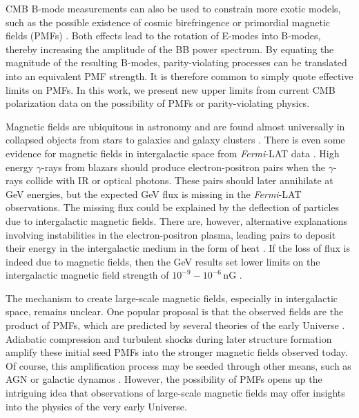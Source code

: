 \documentclass[apj]{emulateapj}
\newcommand{\fermilat}{\textit{Fermi}-LAT}
\begin{document}
CMB B-mode measurements can also be used to constrain more exotic models, such as the possible existence of cosmic birefringence \citep{carroll98,lue99} or primordial magnetic fields (PMFs) \citep{kosowsky96, seshadri01}.  
Both effects lead to the rotation of E-modes into B-modes, thereby increasing the amplitude of the BB power spectrum.
By equating the magnitude of the resulting B-modes, parity-violating processes can be translated into an equivalent PMF strength. 
It is therefore common to simply quote effective limits on PMFs. 
In this work, we present new upper limits from current CMB polarization data on the possibility of PMFs or parity-violating physics. 

Magnetic fields are ubiquitous in astronomy and are found almost universally in collapsed objects from stars to galaxies and galaxy clusters \citep[for a review, see][]{ryu12, widrow12}. 
There is even some evidence for magnetic fields in intergalactic space from \fermilat{} data \citep{neronov10}.
High energy $\gamma$-rays from blazars should  produce electron-positron pairs when the $\gamma$-rays collide with IR or optical photons. 
These pairs should later annihilate at GeV energies, but the expected GeV flux is missing in the \fermilat{} observations. 
The missing flux could be explained by the deflection of particles due to intergalactic magnetic fields. 
There are, however, alternative explanations involving instabilities in the electron-positron plasma, leading pairs to deposit their energy in the intergalactic medium in the form of heat \citep{broderick12}.
If the loss of flux is indeed due to magnetic fields, then the GeV results set lower limits on the intergalactic magnetic field strength of $10^{-9} - 10^{-6}$\,nG \citep{tavecchio10,taylor11,dermer11,vovk12}.



The mechanism to create large-scale magnetic fields, especially in intergalactic space, remains unclear. 
One popular proposal is that the observed fields are the product of PMFs, which are predicted by several theories of the early Universe \citep[e.g.,][]{turner88, grasso98,ichiki06}. 
Adiabatic compression and turbulent shocks during later structure formation amplify these initial seed PMFs into the stronger magnetic fields observed today. 
Of course, this amplification process may be seeded through other means, such as AGN or galactic dynamos \citep[for a review, see][]{giovannini04}. 
However, the possibility of PMFs opens up the intriguing idea that observations of large-scale magnetic fields may offer insights into the physics of the very early Universe. 
\end{document}
